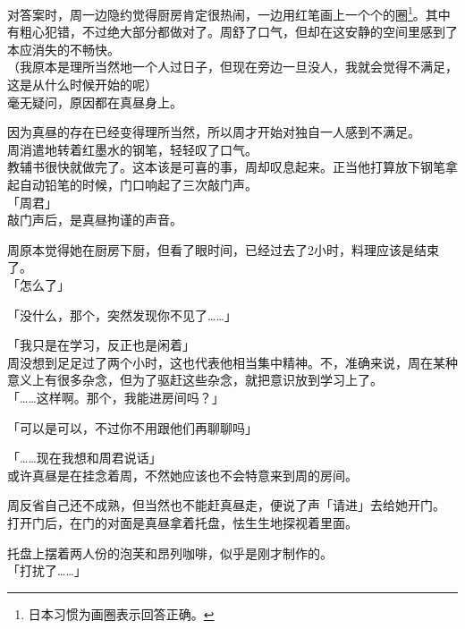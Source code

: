 对答案时，周一边隐约觉得厨房肯定很热闹，一边用红笔画上一个个的圈\footnote{日本习惯为画圈表示回答正确。}。其中有粗心犯错，不过绝大部分都做对了。周舒了口气，但却在这安静的空间里感到了本应消失的不畅快。\\

（我原本是理所当然地一个人过日子，但现在旁边一旦没人，我就会觉得不满足，这是从什么时候开始的呢）\\

毫无疑问，原因都在真昼身上。

因为真昼的存在已经变得理所当然，所以周才开始对独自一人感到不满足。\\

周消遣地转着红墨水的钢笔，轻轻叹了口气。\\

教辅书很快就做完了。这本该是可喜的事，周却叹息起来。正当他打算放下钢笔拿起自动铅笔的时候，门口响起了三次敲门声。\\

「周君」\\

敲门声后，是真昼拘谨的声音。

周原本觉得她在厨房下厨，但看了眼时间，已经过去了2小时，料理应该是结束了。\\

「怎么了」

「没什么，那个，突然发现你不见了……」

「我只是在学习，反正也是闲着」\\

周没想到足足过了两个小时，这也代表他相当集中精神。不，准确来说，周在某种意义上有很多杂念，但为了驱赶这些杂念，就把意识放到学习上了。\\

「……这样啊。那个，我能进房间吗？」

「可以是可以，不过你不用跟他们再聊聊吗」

「……现在我想和周君说话」\\

或许真昼是在挂念着周，不然她应该也不会特意来到周的房间。

周反省自己还不成熟，但当然也不能赶真昼走，便说了声「请进」去给她开门。\\

打开门后，在门的对面是真昼拿着托盘，怯生生地探视着里面。

托盘上摆着两人份的泡芙和昂列咖啡，似乎是刚才制作的。\\

「打扰了……」\\

